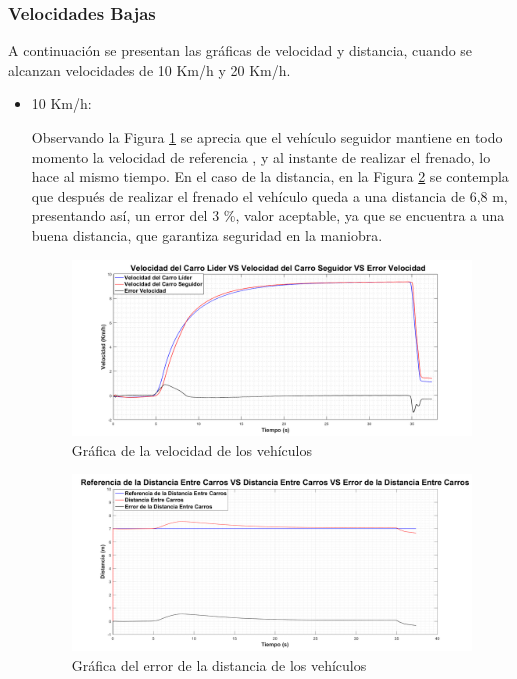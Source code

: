 \subsubsection{Velocidades Bajas}
A continuación se presentan las gráficas de velocidad y distancia, cuando se alcanzan velocidades de 10 Km/h y 20 Km/h. 
\begin{itemize}

\item 10 Km/h:

Observando la Figura \ref{fig:velstg10} se aprecia que el vehículo seguidor mantiene en todo momento la velocidad de referencia , y al instante de realizar el frenado, lo hace al mismo tiempo. En el caso de la distancia, en la Figura \ref{fig:diststg10} se contempla que después de realizar el frenado el vehículo queda a una distancia de 6,8 m, presentando así, un error del 3 \%, valor aceptable, ya que se encuentra a una buena distancia, que garantiza seguridad en la maniobra.\\
 
\begin{figure}[H]
	\centering
		\includegraphics[scale=0.35]{Imagenes/stg10}
		\caption{Gráfica de la velocidad de los vehículos}
		\label{fig:velstg10}
\end{figure}	

\begin{figure}[H]
	\centering
		\includegraphics[scale=0.35]{Imagenes/stg10dist}
		\caption{Gráfica del error de la distancia de los vehículos}
		\label{fig:diststg10}
\end{figure}	


\end{itemize}
